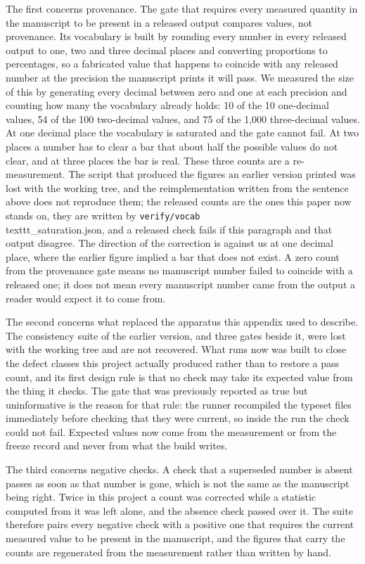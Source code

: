 The first concerns provenance. The gate that requires every measured quantity in the manuscript to be present in a released output compares values, not provenance. Its vocabulary is built by rounding every number in every released output to one, two and three decimal places and converting proportions to percentages, so a fabricated value that happens to coincide with any released number at the precision the manuscript prints it will pass. We measured the size of this by generating every decimal between zero and one at each precision and counting how many the vocabulary already holds: 10 of the 10 one-decimal values, 54 of the 100 two-decimal values, and 75 of the 1,000 three-decimal values. At one decimal place the vocabulary is saturated and the gate cannot fail. At two places a number has to clear a bar that about half the possible values do not clear, and at three places the bar is real. These three counts are a re-measurement. The script that produced the figures an earlier version printed was lost with the working tree, and the reimplementation written from the sentence above does not reproduce them; the released counts are the ones this paper now stands on, they are written by \texttt{verify/vocab}\\texttt{\_saturation}.json, and a released check fails if this paragraph and that output disagree. The direction of the correction is against us at one decimal place, where the earlier figure implied a bar that does not exist. A zero count from the provenance gate means no manuscript number failed to coincide with a released one; it does not mean every manuscript number came from the output a reader would expect it to come from.

The second concerns what replaced the apparatus this appendix used to describe. The consistency suite of the earlier version, and three gates beside it, were lost with the working tree and are not recovered. What runs now was built to close the defect classes this project actually produced rather than to restore a pass count, and its first design rule is that no check may take its expected value from the thing it checks. The gate that was previously reported as true but uninformative is the reason for that rule: the runner recompiled the typeset files immediately before checking that they were current, so inside the run the check could not fail. Expected values now come from the measurement or from the freeze record and never from what the build writes.

The third concerns negative checks. A check that a superseded number is absent passes as soon as that number is gone, which is not the same as the manuscript being right. Twice in this project a count was corrected while a statistic computed from it was left alone, and the absence check passed over it. The suite therefore pairs every negative check with a positive one that requires the current measured value to be present in the manuscript, and the figures that carry the counts are regenerated from the measurement rather than written by hand.

